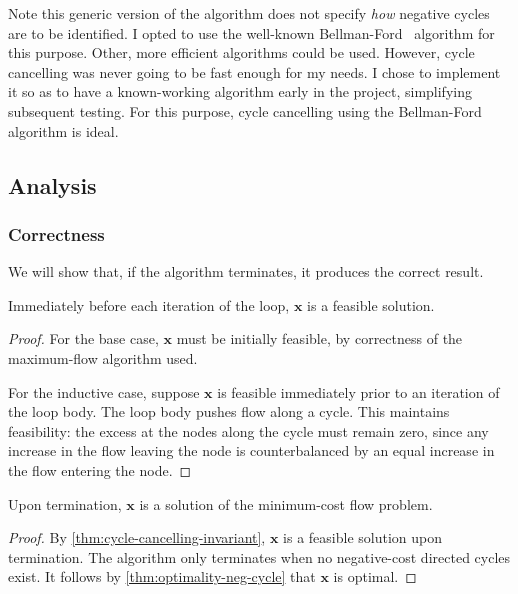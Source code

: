 Note this generic version of the algorithm does not specify \emph{how} negative cycles are to be identified. I opted to use the well-known Bellman-Ford~\cite[p.~651]{CLRS:2009} algorithm for this purpose. Other, more efficient algorithms could be used. However, cycle cancelling was never going to be fast enough for my needs\footnotemark. I chose to implement it so as to have a known-working algorithm early in the project, simplifying subsequent testing. For this purpose, cycle cancelling using the Bellman-Ford algorithm is ideal.


\subsection{Analysis}

\subsubsection{Correctness}

We will show that, if the algorithm terminates, it produces the correct result. \\

\begin{thm} \label{thm:cycle-cancelling-invariant}
Immediately before each iteration of the loop, $\mathbf{x}$ is a feasible solution.
\end{thm} 
\begin{proof}
For the base case, $\mathbf{x}$ must be initially feasible, by correctness of the maximum-flow algorithm used.

For the inductive case, suppose $\mathbf{x}$ is feasible immediately prior to an iteration of the loop body. The loop body pushes flow along a cycle. This maintains feasibility: the excess at the nodes along the cycle must remain zero, since any increase in the flow leaving the node is counterbalanced by an equal increase in the flow entering the node.
\end{proof}

\begin{cor}
Upon termination, $\mathbf{x}$ is a solution of the minimum-cost flow problem.
\end{cor}
\begin{proof}
By \cref{thm:cycle-cancelling-invariant}, $\mathbf{x}$ is a feasible solution upon termination. The algorithm only terminates when no negative-cost directed cycles exist. It follows by \cref{thm:optimality-neg-cycle} that $\mathbf{x}$ is optimal.
\end{proof}


